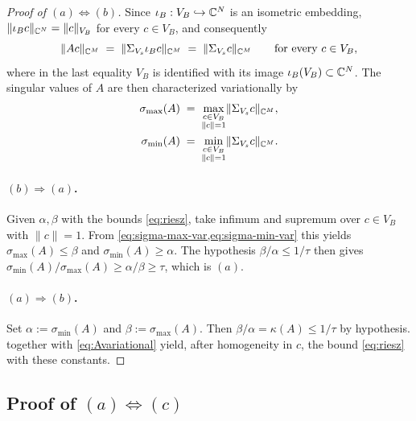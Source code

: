 \begin{proof}[Proof of $(a) \Leftrightarrow (b)$]
Since $\iota_B : V_B \hookrightarrow \mathbb{C}^N$ is an isometric embedding,
$\lVert \iota_B c \rVert_{\mathbb{C}^N} = \lVert c \rVert_{V_B}$ for every
$c \in V_B$, and consequently
\begin{equation}\label{eq:Avariational}
  \lVert A c \rVert_{\mathbb{C}^M}
  \;=\;
  \lVert \Sigma_{V_s} \iota_B c \rVert_{\mathbb{C}^M}
  \;=\;
  \lVert \Sigma_{V_s} c \rVert_{\mathbb{C}^M}
  \qquad \text{for every } c \in V_B,
\end{equation}
where in the last equality $V_B$ is identified with its image
$\iota_B(V_B) \subset \mathbb{C}^N$. The singular values of $A$ are then
characterized variationally by
\begin{align}
  \sigma_{\max}(A)
    &\;=\; \max_{\substack{c \in V_B \\ \lVert c \rVert = 1}}
        \lVert \Sigma_{V_s} c \rVert_{\mathbb{C}^M},
    \label{eq:sigma-max-var} \\
  \sigma_{\min}(A)
    &\;=\; \min_{\substack{c \in V_B \\ \lVert c \rVert = 1}}
        \lVert \Sigma_{V_s} c \rVert_{\mathbb{C}^M}.
    \label{eq:sigma-min-var}
\end{align}

\paragraph{$(b) \Rightarrow (a)$.}
Given $\alpha, \beta$ with the bounds \cref{eq:riesz}, take infimum
and supremum over $c \in V_B$ with $\lVert c \rVert = 1$. From
\cref{eq:sigma-max-var,eq:sigma-min-var} this yields
$\sigma_{\max}(A) \le \beta$ and $\sigma_{\min}(A) \ge \alpha$. The
hypothesis $\beta / \alpha \le 1/\tau$ then gives
$\sigma_{\min}(A) / \sigma_{\max}(A) \ge \alpha / \beta \ge \tau$,
which is $(a)$.

\paragraph{$(a) \Rightarrow (b)$.}
Set $\alpha := \sigma_{\min}(A)$ and $\beta := \sigma_{\max}(A)$.
Then $\beta / \alpha = \kappa(A) \le 1/\tau$ by hypothesis.
 together with
\cref{eq:Avariational} yield, after homogeneity in $c$, the bound
\cref{eq:riesz} with these constants.
\end{proof}

\subsection{Proof of $(a) \Leftrightarrow (c)$}\label{subsec:tri-ac}

